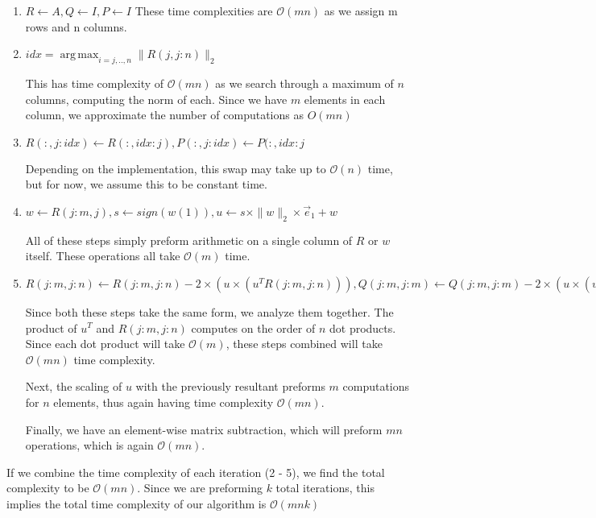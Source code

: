 \documentclass[12pt]{article}
\newcommand{\cO}{\mathcal{O}}
\DeclareMathOperator*{\argmax}{arg\,max}
\begin{document}
\begin{enumerate}
    \item $R\gets A, Q \gets I, P \gets I$
          These time complexities are $\cO(mn)$ as we assign m rows and n columns.
          
    \item $idx = \argmax_{i =j,..,n} \|R(j,j:n)\|_2$
          
          This has time complexity of $\cO(mn)$ as we search through a maximum of $n$ columns, computing the norm of each. Since we have $m$ elements in each column, we approximate the number of computations as $O(mn)$
          
    \item $R(:, j :idx) \gets R(:, idx: j), P(:,j:idx) \gets P(:, idx:j$
          
          Depending on the implementation, this swap may take up to $\cO(n)$ time, but for now, we assume this to be constant time.
          
    \item $w \gets R(j:m,j), s \gets sign(w(1)), u \gets s \times \|w\|_2 \times \vec{e}_1 + w$
          
          All of these steps simply preform arithmetic on a single column of $R$ or $w$ itself. These operations all take $\cO(m)$ time.
          
    \item $R(j:m, j:n) \gets R(j:m, j:n) - 2 \times ( u \times (u^TR(j:m,j:n))), Q(j:m, j:m) \gets Q(j:m, j:m) - 2 \times ( u \times (u^TQ(j:m,j:n)))$
          
          Since both these steps take the same form, we analyze them together. The product of $u^T$ and $R(j:m,j:n)$ computes on the order of $n$ dot products. Since each dot product will take $\cO(m)$, these steps combined will take $\cO(mn)$ time complexity. 
          
          Next, the scaling of $u$ with the previously resultant preforms $m$ computations for $n$ elements, thus again having time complexity $\cO(mn)$.
          
          Finally, we have an element-wise matrix subtraction, which will preform $mn$ operations, which is again $\cO(mn)$.
\end{enumerate}

If we combine the time complexity of each iteration (2 - 5), we find the total complexity to be $\cO(mn)$. Since we are preforming $k$ total iterations, this implies the total time complexity of our algorithm is $\cO(mnk)$
\end{document}
